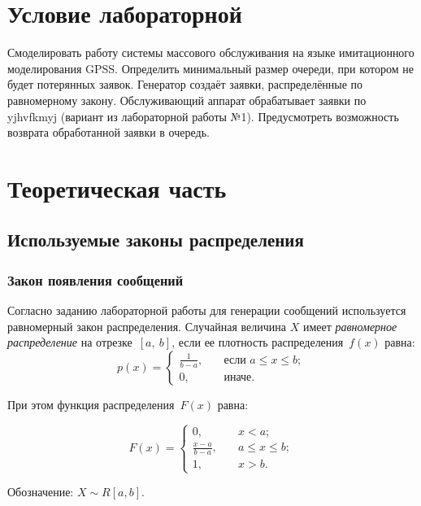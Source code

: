 \chapter{Условие лабораторной}

Смоделировать работу системы массового обслуживания на языке имитационного моделирования GPSS. Определить минимальный размер очереди,
при котором не будет потерянных заявок.
Генератор создаёт заявки, распределённые по равномерному закону.
Обслуживающий аппарат обрабатывает заявки по yjhvfkmyj (вариант из
лабораторной работы №1). Предусмотреть возможность возврата обработанной
заявки в очередь.


\chapter{Теоретическая часть}

\section{Используемые законы распределения}

\subsection*{Закон появления сообщений}

Согласно заданию лабораторной работы для генерации сообщений используется равномерный закон распределения.
Случайная величина $X$ имеет \textit{равномерное распределение} на отрезке~$[a,~b]$, если ее плотность распределения~$f(x)$ равна:
\begin{equation}
	p(x) =
	\begin{cases}
		\displaystyle\frac{1}{b - a}, & \quad \text{если } a \leq x \leq b;\\
		0,  & \quad \text{иначе}.
	\end{cases}
\end{equation}

При этом функция распределения~$F(x)$ равна:

\begin{equation}
	F(x) =
	\begin{cases}
		0,  & \quad x < a;\\
		\displaystyle\frac{x - a}{b - a}, & \quad a \leq x \leq b;\\
		1,  & \quad x > b.
	\end{cases}
\end{equation}

Обозначение: $X \sim R[a, b]$.

